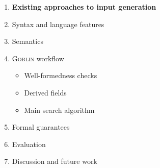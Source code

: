 \documentclass[11pt,xcolor={dvipsnames},hyperref={pdftex,pdfpagemode=UseNone,hidelinks,pdfdisplaydoctitle=true},usepdftitle=false]{beamer}
\newcommand{\system}{\textsc{Goblin}}
\newcommand{\green}[1]{\textcolor{green!60!black}{#1}}
\begin{document}
\begin{frame}
\begin{enumerate}
  \item \green{\textbf{Existing approaches to input generation}}
  \item Syntax and language features
  \item Semantics 
  \item \system{} workflow
  \begin{itemize}
    \item Well-formedness checks
    \item Derived fields
    \item Main search algorithm
  \end{itemize}
  \item Formal guarantees
  \item Evaluation
  \item Discussion and future work
\end{enumerate}
\end{frame}
\end{document}
